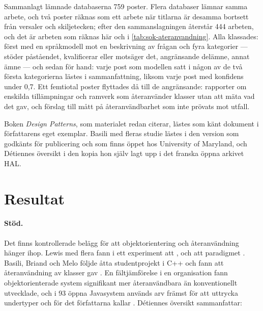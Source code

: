 Sammanlagt lämnade databaserna 759 poster.  Flera databaser lämnar
samma arbete, och två poster räknas som ett arbete när titlarna är
desamma bortsett från versaler och skiljetecken; efter den
sammanslagningen återstår 444 arbeten, och det är arbeten som räknas här
och i \cref{tab:sok-ateranvandning}.  Alla klassades: först med en
språkmodell mot en beskrivning av frågan och fyra kategorier --- stöder
påståendet, kvalificerar eller motsäger det, angränsande delämne, annat
ämne --- och sedan för hand: varje post som modellen satt i någon av de
två första kategorierna lästes i sammanfattning, liksom varje post med
konfidens under 0,7.  Ett femtiotal poster flyttades då till de
angränsande: rapporter om enskilda tillämpningar och ramverk som
återanvänder klasser utan att mäta vad det gav, och förslag till mått på
återanvändbarhet som inte prövats mot utfall.

Boken \emph{Design Patterns}\autocite{Gamma1994DesignPatterns}, som
materialet redan citerar, lästes som känt dokument i författarens eget
exemplar.  Basili med fleras studie lästes i den version som godkänts
för publicering och som finns öppet hos University of Maryland, och
Détiennes översikt\autocite{Detienne1997} i den kopia hon själv lagt
upp i det franska öppna arkivet HAL.

\section{Resultat}
\label{sec:ater-resultat}

\paragraph{Stöd.}  Det finns kontrollerade belägg för att
objektorientering och återanvändning hänger ihop.  Lewis med flera fann i
ett experiment att , och att
paradigmet .  Basili, Briand och Melo följde åtta studentprojekt i C++
och fann att återanvändning av klasser gav
.
En fältjämförelse i en organisation fann objektorienterade system
signifikant mer återanvändbara än konventionellt
utvecklade\autocite{LowHuan1999}, och i 93 öppna Javasystem används arv
främst för att uttrycka undertyper och för det författarna kallar
.  Détiennes
översikt sammanfattar: 

